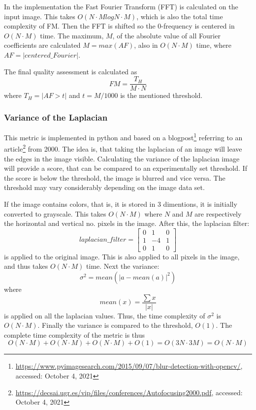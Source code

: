 In the implementation\cite{code_FM} the Fast Fourier Transform (FFT) is calculated on the input image. This takes $O(N\cdot M log N\cdot M)$\cite{FM}, which is also the total time complexity of FM. Then the FFT is shifted so the 0-frequency is centered in $O(N\cdot M)$ time. The maximum, $M$, of the absolute value of all Fourier coefficients are calculated $M=max(AF)$, also in $O(N\cdot M)$ time, where $AF=|centered\_Fourier|$.

The final quality assessment is calculated as
$$FM=\dfrac{T_H}{M\cdot N}$$
where $T_H=|AF > t|$ and $t = M/1000$ is the mentioned threshold.


\subsubsection{Variance of the Laplacian}
This metric is implemented in python\cite{code_LV} and based on a blogpost\footnote{\url{https://www.pyimagesearch.com/2015/09/07/blur-detection-with-opencv/}, accessed: October 4, 2021} referring to an article\footnote{\url{https://decsai.ugr.es/vip/files/conferences/Autofocusing2000.pdf}, accessed: October 4, 2021} from 2000. The idea is, that taking the laplacian of an image will leave the edges in the image visible. Calculating the variance of the laplacian image will provide a score, that can be compared to an experimentally set threshold. If the score is below the threshold, the image is blurred and vice versa. The threshold may vary considerably depending on the image data set.

If the image contains colors, that is, it is stored in 3 dimentions, it is initially converted to grayscale. This takes $O(N\cdot M)$ where $N$ and $M$ are respectively the horizontal and vertical no. pixels in the image. After this, the laplacian filter\cite{code_LV}:
$$laplacian\_filter = 
\begin{bmatrix}
0 &  1 & 0\\
1 & -4 & 1\\
0 &  1 & 0
\end{bmatrix}$$
is applied to the original image. This is also applied to all pixels in the image, and thus takes $O(N\cdot M)$ time. Next the variance:
$$\sigma^2 = mean(|a - mean(a)|^2)$$
where 
$$mean(x) = \dfrac{\sum {x}}{|x|}$$
is applied on all the laplacian values. Thus, the time complexity of $\sigma^2$ is $O(N\cdot M)$. Finally the variance is compared to the threshold, $O(1)$. The complete time complexity of the metric is thus $$O(N\cdot M) + O(N\cdot M) + O(N\cdot M) + O(1) = O(3N\cdot 3M) = O(N\cdot M)$$


